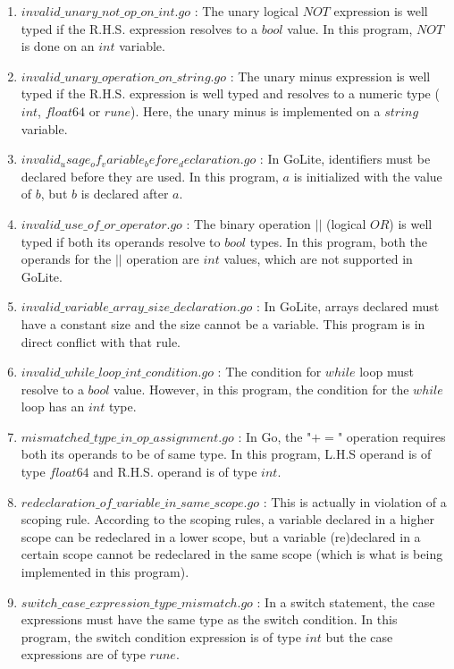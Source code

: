 \documentclass[preprint,12pt]{elsarticle}
\begin{document}
\begin{enumerate}
\item $invalid\_unary\_not\_op\_on\_int.go$ : The unary logical $NOT$ expression is well typed if the R.H.S. expression resolves to a $bool$ value. In this program, $NOT$  is done on an $int$ variable.

\item $invalid\_unary\_operation\_on\_string.go$ : The unary minus expression is well typed if the R.H.S. expression is well typed and resolves to a numeric type ($int$, $float64$ or $rune$). Here, the unary minus is implemented on a $string $ variable.

\item $invalid_usage_of_variable_before_declaration.go$ : In GoLite, identifiers must be declared before they are used. In this program, $a$ is initialized with the value of $b$, but $b$ is declared after $a$.

\item $invalid\_use\_of\_or\_operator.go$ : The binary operation $||$ (logical $OR$) is well typed if both its operands resolve to $bool$ types. In this program, both the operands for the $||$ operation are $int$ values, which are not supported in GoLite.

\item $invalid\_variable\_array\_size\_declaration.go$ : In GoLite, arrays declared must have a constant size and the size cannot be a variable. This program is in direct conflict with that rule.

\item $invalid\_while\_loop\_int\_condition.go$ : The condition for $while$ loop must resolve to a $bool$ value. However, in this program, the condition for the $while$ loop has an $int$ type.

\item $mismatched\_type\_in\_op\_assignment.go$ : In Go, the "$+=$" operation requires both its operands to be of same type. In this program, L.H.S operand is of type $float64$ and R.H.S. operand is of type $int$.

\item $redeclaration\_of\_variable\_in\_same\_scope.go$ : This is actually in violation of a scoping rule. According to the scoping rules, a variable declared in a higher scope can be redeclared in a lower scope, but a variable (re)declared in a certain scope cannot be redeclared in the same scope (which is what is being implemented in this program).

\item $switch\_case\_expression\_type\_mismatch.go$ : In a switch statement, the case expressions must have the same type as the switch condition. In this program, the switch condition expression is of type $int$ but the case expressions are of type $rune$.


\end{enumerate}
\end{document}
